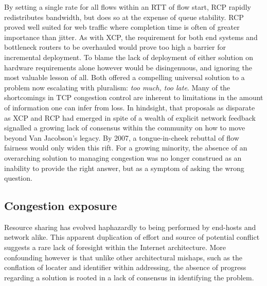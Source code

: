 By setting a single rate for all flows within an \ac{RTT} of flow start, \ac{RCP} rapidly redistributes bandwidth, but does so at the expense of queue stability.
\ac{RCP} proved well suited for web traffic where completion time is often of greater importance than jitter.
As with \ac{XCP}, the requirement for both end systems and bottleneck routers to be overhauled would prove too high a barrier for incremental deployment.
To blame the lack of deployment of either solution on hardware requirements alone however would be disingenuous, and ignoring the most valuable lesson of all. 
Both offered a compelling universal solution to a problem now escalating with pluralism: \emph{too much, too late}.
Many of the shortcomings in \ac{TCP} congestion control are inherent to limitations in the amount of information one can infer from loss.
In hindsight, that proposals as disparate as \ac{XCP} and \ac{RCP} had emerged in spite of a wealth of explicit network feedback signalled a growing lack of consensus within the community on how to move beyond Van Jacobson's legacy. 
By 2007, a tongue-in-cheek rebuttal of flow fairness \cite{Briscoe:2007p261} would only widen this rift.
For a growing minority, the absence of an overarching solution to managing congestion was no longer construed as an inability to provide the right answer, but as a symptom of asking the wrong question.

\subsection{Congestion exposure}

Resource sharing has evolved haphazardly to being performed by end-hosts and network alike. 
This apparent duplication of effort and source of potential conflict suggests a rare lack of foresight within the Internet architecture. 
More confounding however is that unlike other architectural mishaps, such as the conflation of locater and identifier within addressing, the absence of progress regarding a solution is rooted in a lack of consensus in identifying the problem.

